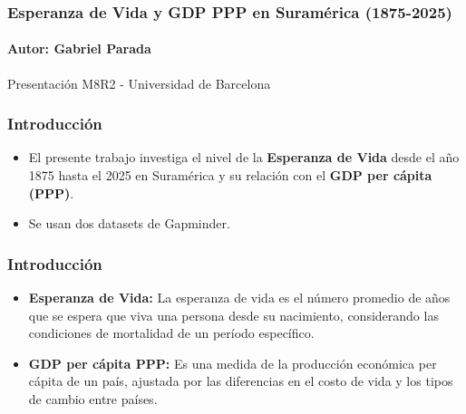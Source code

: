 \documentclass{beamer}
\begin{document}



\begin{frame}
\frametitle{Esperanza de Vida y GDP PPP en Suramérica (1875-2025)}
\framesubtitle{Autor: Gabriel Parada}
Presentación M8R2 - Universidad de Barcelona

\end{frame}


\begin{frame}
\frametitle{Introducción}

\begin{itemize}
\item<1-> El presente trabajo investiga el nivel de la \textbf{Esperanza de Vida} desde el año 1875 hasta el 2025 en Suramérica y su relación con el \textbf{GDP per cápita (PPP)}. 
\item<2-> Se usan dos datasets de Gapminder.
\end{itemize}

\end{frame}

\begin{frame}
\frametitle{Introducción}

\begin{itemize}
\item<1> \textbf{Esperanza de Vida:} La esperanza de vida es el número promedio de años que se espera que viva una persona desde su nacimiento, considerando las condiciones de mortalidad de un período específico.

\item<2> \textbf{GDP per cápita PPP:} Es una medida de la producción económica per cápita de un país, ajustada por las diferencias en el costo de vida y los tipos de cambio entre países.	
\end{itemize}


\end{frame}
\end{document}
